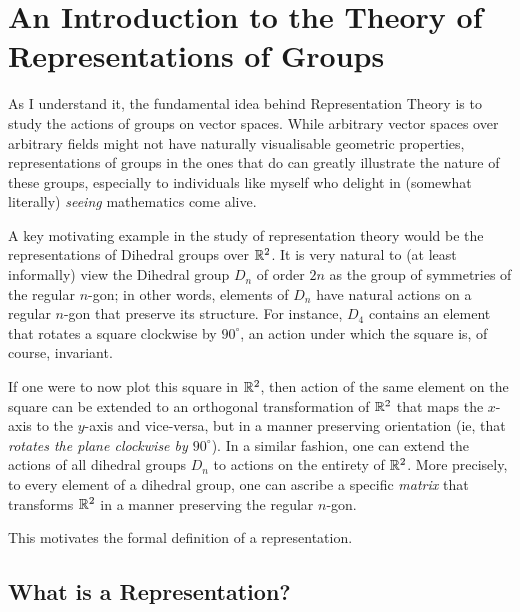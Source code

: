 
\chapter{An Introduction to the Theory of Representations of Groups}
\thispagestyle{empty}

As I understand it, the fundamental idea behind Representation Theory is to study the actions of groups on vector spaces. While arbitrary vector spaces over arbitrary fields might not have naturally visualisable geometric properties, representations of groups in the ones that do can greatly illustrate the nature of these groups, especially to individuals like myself who delight in (somewhat literally) \textit{seeing} mathematics come alive.

\begin{wrapfigure}[9]{r}{0.48\linewidth}
    \centering
    \vspace{-2.25em}
\end{wrapfigure}

A key motivating example in the study of representation theory would be the representations of Dihedral groups over $\mathbb{R}^2$. It is very natural to (at least informally) view the Dihedral group $D_n$ of order $2n$ as the group of symmetries of the regular $n$-gon; in other words, elements of $D_n$ have natural actions on a regular $n$-gon that preserve its structure. For instance, $D_4$ contains an element that rotates a square clockwise by $90^\circ$, an action under which the square is, of course, invariant.

If one were to now plot this square in $\mathbb{R}^2$, then action of the same element on the square can be extended to an orthogonal transformation of $\mathbb{R}^2$ that maps the $x$-axis to the $y$-axis and vice-versa, but in a manner preserving orientation (ie, that \textit{rotates the plane clockwise by $90^\circ$}). In a similar fashion, one can extend the actions of all dihedral groups $D_n$ to actions on the entirety of $\mathbb{R}^2$. More precisely, to every element of a dihedral group, one can ascribe a specific \textit{matrix} that transforms $\mathbb{R}^2$ in a manner preserving the regular $n$-gon.

This motivates the formal definition of a representation.

\section{What is a Representation?}

\begin{boxdefinition}
    
\end{boxdefinition}